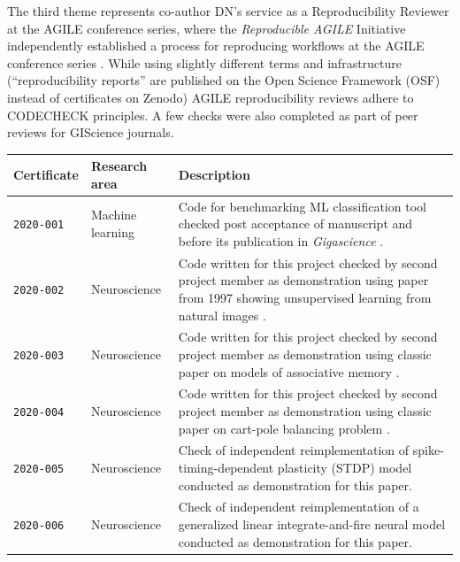 \documentclass[12pt]{article}
\begin{document}
The third theme represents co-author DN's service as a Reproducibility
Reviewer at the AGILE conference series, where the \emph{Reproducible
  AGILE} Initiative \cite{reproducible_agile} independently
established a process for reproducing workflows at the AGILE
conference series \cite{nust_improving_2020}.  While using slightly
different terms and infrastructure (``reproducibility reports'' are
published on the Open Science Framework (OSF) instead of certificates
on Zenodo) AGILE reproducibility reviews adhere to CODECHECK
principles.  A few checks were also completed as part of peer reviews
for GIScience journals.

\begin{table}
  \footnotesize

  \centering

  \begin{tabular}{llp{12cm}}
    \toprule
    \textbf{Certificate} & \textbf{Research area} & \textbf{Description} \\ \midrule
    \texttt{2020-001} \cite{cert-2020-001} & Machine learning & Code for benchmarking ML classification tool checked post acceptance of manuscript and before its publication in \textit{Gigascience} \cite{Piccolo2020-lo}. \\
    \texttt{2020-002}  \cite{cert-2020-002} & Neuroscience & Code written for this project checked by second project member as demonstration using paper from 1997 showing unsupervised learning from natural images \cite{Hancock1992-mp}. \\
    \texttt{2020-003}  \cite{cert-2020-003} & Neuroscience &  Code written for this project checked by second project member as demonstration using classic paper on models of associative memory \cite{Hopfield1982-mz}. \\
    \texttt{2020-004}  \cite{cert-2020-004} & Neuroscience & Code written for this project checked by second project member as demonstration using classic paper on cart-pole balancing problem \cite{Barto1983-rg}. \\
    \texttt{2020-005}  \cite{cert-2020-005} & Neuroscience & Check of independent reimplementation of spike-timing-dependent plasticity (STDP) model \cite{larisch_re_2019} conducted as demonstration for this paper. \\ %
    \texttt{2020-006}  \cite{cert-2020-006} & Neuroscience & Check of independent reimplementation of a generalized linear integrate-and-fire neural model \cite{detorakis_re_2017} conducted as demonstration for this paper. \\

\end{tabular}
\end{table}
\end{document}

